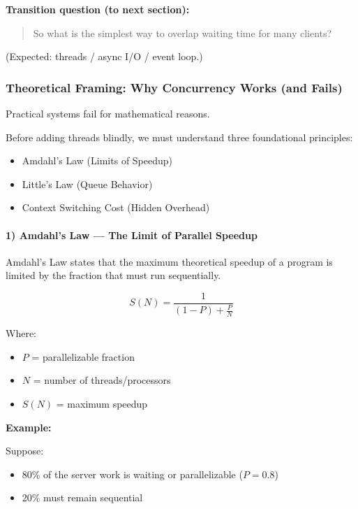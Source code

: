 \documentclass[11pt,a4paper]{article}
\begin{document}
\textbf{Transition question (to next section):}
\begin{quote}
	So what is the simplest way to overlap waiting time for many clients?
\end{quote}
(Expected: threads / async I/O / event loop.)




\subsubsection*{Theoretical Framing: Why Concurrency Works (and Fails)}

Practical systems fail for mathematical reasons.

Before adding threads blindly, we must understand three foundational principles:

\begin{itemize}
	\item Amdahl's Law (Limits of Speedup)
	\item Little's Law (Queue Behavior)
	\item Context Switching Cost (Hidden Overhead)
\end{itemize}

\paragraph{1) Amdahl's Law --- The Limit of Parallel Speedup}

Amdahl's Law states that the maximum theoretical speedup of a program is limited by the fraction that must run sequentially.

\[
S(N) = \frac{1}{(1 - P) + \frac{P}{N}}
\]

Where:
\begin{itemize}
	\item $P$ = parallelizable fraction
	\item $N$ = number of threads/processors
	\item $S(N)$ = maximum speedup
\end{itemize}

\textbf{Example:}

Suppose:
\begin{itemize}
	\item 80\% of the server work is waiting or parallelizable ($P=0.8$)
	\item 20\% must remain sequential
\end{itemize}
\end{document}
